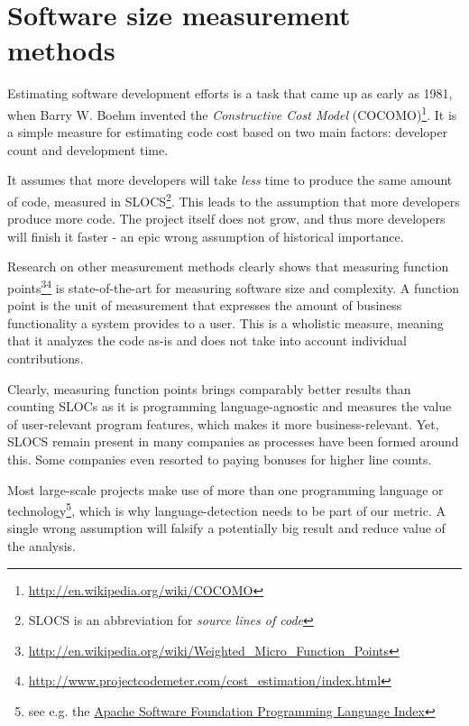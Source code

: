\section{Software size measurement methods}
Estimating software development efforts is a task that
came up as early as 1981, when Barry W. Boehm invented the \textit{
Constructive Cost Model} (COCOMO)\footnote{\url{http://en.wikipedia.org/wiki/COCOMO}}.
It is a simple measure for estimating code cost
based on two main factors: developer count and development time.
\newline

It assumes that more developers will take \textit{less} time to produce the
same amount of code, measured in SLOCS\footnote{SLOCS is an abbreviation for
\textit{source lines of code}}.
This leads to the assumption that more developers produce more code.
The project itself does not grow, and thus more developers will finish it faster -
an epic wrong assumption of historical importance\cite{fb:1975}.
\newline

Research on other measurement methods clearly shows that measuring
function points\footnote{\url{http://en.wikipedia.org/wiki/Weighted_Micro_Function_Points}}\footnote{\url{http://www.projectcodemeter.com/cost_estimation/index.html}}
is state-of-the-art for measuring software size and complexity.\cite{linkedin:functionpointstandard}
A function point is the unit of measurement that expresses the amount of
business functionality a system provides to a user. This is a wholistic
measure, meaning that it analyzes the code as-is and does not take into
account individual contributions.

Clearly, measuring function points brings comparably better results
than counting SLOCs as it is programming language-agnostic and measures
the value of user-relevant program features, which makes it more
business-relevant. Yet, SLOCS remain present in many companies as processes
have been formed around this. Some companies even resorted to paying
bonuses for higher line counts\cite{am:2009}.
\newline

Most large-scale projects make use of more than one programming language
or technology\footnote{see e.g. the \href{http://projects.apache.org/indexes/language.html}{Apache Software Foundation Programming Language Index}}, which is why language-detection
needs to be part of our metric. A single wrong assumption will falsify
a potentially big result and reduce value of the analysis.
\newline

